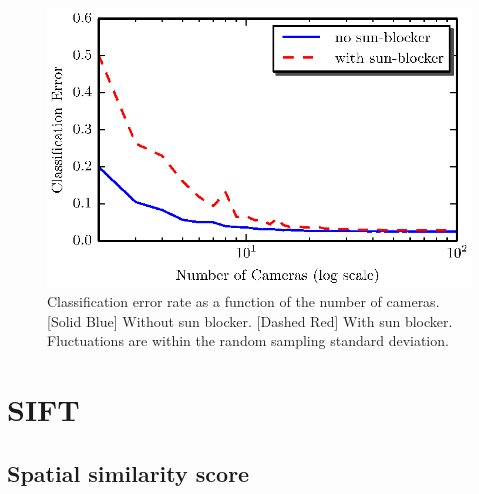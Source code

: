 \documentclass[runningheads]{llncs}
\begin{document}
\begin{figure}
  \begin{center}
    \includegraphics{figures/simulations.eps}
    \caption{Classification error rate as a function of the number of
      cameras. [Solid Blue] Without sun blocker. [Dashed Red] With sun
      blocker.  Fluctuations are within the random sampling standard
      deviation.}
    \label{fig:simulation}
  \end{center}
\end{figure}


\section{SIFT}

\subsection*{Spatial similarity score}
\label{sec:appearancecore}
\end{document}
